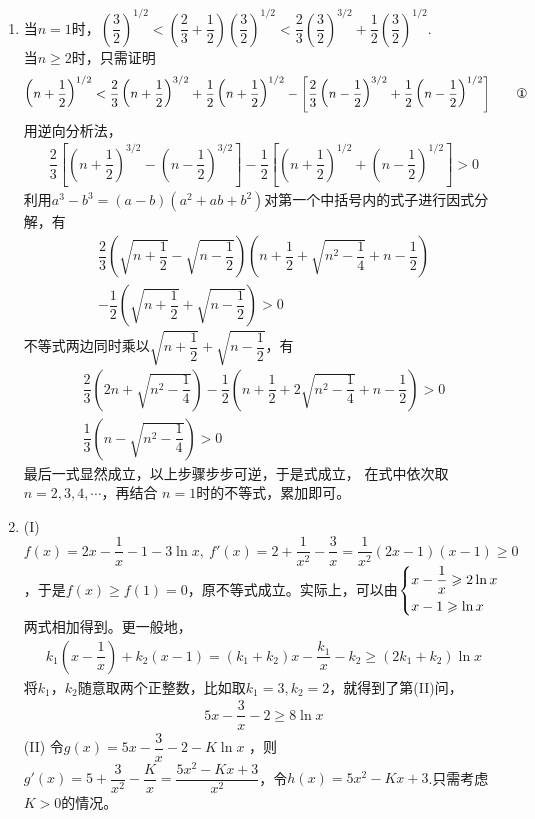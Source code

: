 \begin{enumerate}[label={\textbf{\thechapter.\arabic*}},leftmargin=
    \inteval{\myenumleftmargin}pt]
\item 当$n=1$时，$\left(\dfrac{3}{2}\right)^{1/2}<\left(
\dfrac{2}{3}+\dfrac{1}{2}\right)\left(\dfrac{3}{2}\right)^{1/2}
<\dfrac{2}{3}\left(\dfrac{3}{2}\right)^{3/2}+\dfrac{1}{2}
\left(\dfrac{3}{2}\right)^{1/2}$. \\
当$n\geq 2$时，只需证明
\begin{align}
{\small  \left(n+\dfrac{1}{2}\right)^{1/2}
    <\dfrac{2}{3}\left(n+\dfrac{1}{2}\right)^{3/2}+\dfrac{1}{2}
    \left(n+\dfrac{1}{2}\right)^{1/2} 
    -\left[\dfrac{2}{3}\left(n-\dfrac{1}{2}\right)^{3/2}+
    \dfrac{1}{2}\left(n-\dfrac{1}{2}\right)^{1/2}\right] } 
    \tag*{\ding{172}}
\end{align}
用逆向分析法，
\begin{gather*}
    \dfrac{2}{3}\left[\left(n+\dfrac{1}{2}\right)^{3/2}-
    \left(n-\dfrac{1}{2}\right)^{3/2}\right]-
    \dfrac{1}{2}\left[\left(n+\dfrac{1}{2}\right)^{1/2}+
    \left(n-\dfrac{1}{2}\right)^{1/2}\right] > 0  
\end{gather*}
利用$a^3-b^3=(a-b)(a^2+ab+b^2)$对第一个中括号内的式子进行因式分解，有
\begin{gather*}
    \dfrac{2}{3}\left(\sqrt{n+\dfrac{1}{2}}-
    \sqrt{n-\dfrac{1}{2}}\right)\left(n+\dfrac{1}{2}+
    \sqrt{n^2-\dfrac{1}{4}}+n-\dfrac{1}{2}\right) \\
    -\dfrac{1}{2}\left(\sqrt{n+\dfrac{1}{2}}+
    \sqrt{n-\dfrac{1}{2}}\right)>0
\end{gather*}
不等式两边同时乘以$ \sqrt{n+\dfrac{1}{2}}+
\sqrt{n-\dfrac{1}{2}} $，有
\begin{gather*}
    \dfrac{2}{3}\left(2n+\sqrt{n^2-\dfrac{1}{4}}\right)
    -\dfrac{1}{2}\left(n+\dfrac{1}{2}+
    2\sqrt{n^2-\dfrac{1}{4}}+n-\dfrac{1}{2}\right)>0 \\
    \dfrac{1}{3}\left(n-\sqrt{n^2-\dfrac{1}{4}}\right)>0
\end{gather*}
最后一式显然成立，以上步骤步步可逆，于是式成立，
在式中依次取$n=2,3,4,\cdots$，再结合
$n=1$时的不等式，累加即可。

\item (I)
$ f(x)=2x-\dfrac{1}{x}-1-3\ln x,\ f'(x)=2+\dfrac{1}{x^2}-\dfrac{3}{x}=\dfrac{1}{x^2}
(2x-1)(x-1)\geq 0 $，于是$ f(x)\geq f(1)=0 $，原不等式成立。实际上，可以由$ \begin{dcases}
    x-\dfrac{1}{x} \geq 2\ln x\\
    x-1 \geq \ln x
\end{dcases}$两式相加得到。更一般地，
\begin{gather*}
    k_1\left(x-\dfrac{1}{x}\right)+k_2(x-1)=(k_1+k_2)x-\dfrac{k_1}{x}-k_2
    \geq (2k_1+k_2)\ln x 
\end{gather*}
将$k_1，k_2 $随意取两个正整数，比如取$ k_1=3,k_2=2 $，就得到了第(II)问，
\begin{gather*}
    5x-\dfrac{3}{x}-2\geq 8\ln x
\end{gather*}
(II) 令$ g(x)=5x-\dfrac{3}{x}-2-K\ln x$ ，则$ g'(x)=5+\dfrac{3}{x^2}-\dfrac{K}{x}=\dfrac{5x^2-Kx+3}{x^2} $，令$ h(x)=5x^2-Kx+3 $.只需考虑$ K>0 $的情况。 


\end{enumerate}
